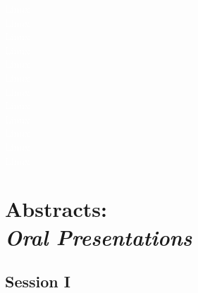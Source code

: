 \documentclass[titlepage,oneside,openany,10pt]{book}
\begin{document}
\textcolor{white}{Linux}\\
\textcolor{white}{Linux}\\
\textcolor{white}{Linux}\\
\textcolor{white}{Linux}\\\textcolor{white}{Linux}\\
\textcolor{white}{Linux}\\\textcolor{white}{Linux}\\
\textcolor{white}{Linux}\\\textcolor{white}{Linux}\\
\textcolor{white}{Linux}\\\textcolor{white}{Linux}\\
\textcolor{white}{Linux}\\




\chapter*{Abstracts:\\ \textit{Oral Presentations}}
\label{chapter:abstracts_oral}

\newpage

\section*{Session I}
\label{sec:sessI}

\vspace{0.5cm}
\end{document}
